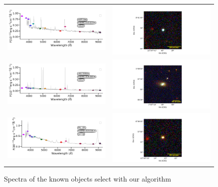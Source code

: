\documentclass[fleqn,usenatbib]{mnras}
\begin{document}
\begin{figure}
\begin{tabular}{ll}
    \includegraphics[trim=10 0 10 20, clip]{Figs/spec-0376-52143-0631-STRIPE82-0142-027354.pdf} & \includegraphics[width=0.3\linewidth, trim=10 0 65 20, clip]{Figs/FASTT1560_338-0_100_r.pdf} \\
     \includegraphics[trim=10 0 10 20, clip]{Figs/spec-0397-51794-0336-STRIPE82-0026-058736.pdf} & \includegraphics[width=0.3\linewidth, trim=10 0 65 20, clip]{Figs/LEDA1185205_17-1_200_r.pdf} \\
     \includegraphics[trim=10 0 10 20, clip]{Figs/spec-9217-57934-0839-STRIPE82-0143-016137.pdf} & \includegraphics[width=0.3\linewidth, trim=10 0 65 20, clip]{Figs/PHL354_339-0_100_r.pdf} \\
  \end{tabular}
  \caption{Spectra of the known objects select with our algorithm }
  \label{fig:color-diagram}
\end{figure}
\end{document}
